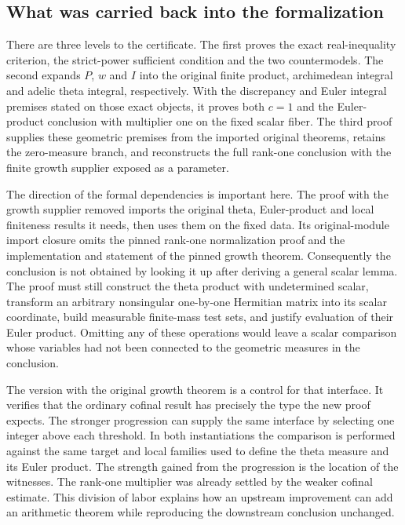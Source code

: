 \documentclass[12pt,letterpaper]{article}
\begin{document}
\subsection{What was carried back into the formalization}

There are three levels to the certificate. The first proves the exact real-inequality criterion, the strict-power sufficient condition and the two countermodels. The second expands $P$, $w$ and $I$ into the original finite product, archimedean integral and adelic theta integral, respectively. With the discrepancy and Euler integral premises stated on those exact objects, it proves both $c=1$ and the Euler-product conclusion with multiplier one on the fixed scalar fiber. The third proof supplies these geometric premises from the imported original theorems, retains the zero-measure branch, and reconstructs the full rank-one conclusion with the finite growth supplier exposed as a parameter.

The direction of the formal dependencies is important here. The proof with the growth supplier removed imports the original theta, Euler-product and local finiteness results it needs, then uses them on the fixed data. Its original-module import closure omits the pinned rank-one normalization proof and the implementation and statement of the pinned growth theorem. Consequently the conclusion is not obtained by looking it up after deriving a general scalar lemma. The proof must still construct the theta product with undetermined scalar, transform an arbitrary nonsingular one-by-one Hermitian matrix into its scalar coordinate, build measurable finite-mass test sets, and justify evaluation of their Euler product. Omitting any of these operations would leave a scalar comparison whose variables had not been connected to the geometric measures in the conclusion.

The version with the original growth theorem is a control for that interface. It verifies that the ordinary cofinal result has precisely the type the new proof expects. The stronger progression can supply the same interface by selecting one integer above each threshold. In both instantiations the comparison is performed against the same target and local families used to define the theta measure and its Euler product. The strength gained from the progression is the location of the witnesses. The rank-one multiplier was already settled by the weaker cofinal estimate. This division of labor explains how an upstream improvement can add an arithmetic theorem while reproducing the downstream conclusion unchanged.
\end{document}

